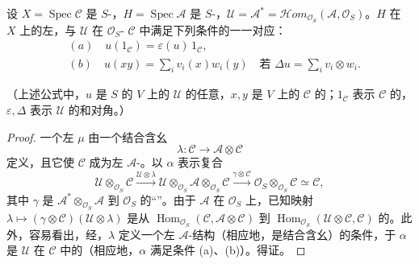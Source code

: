 \begin{SGAresult}{}{}
设 $X=\operatorname{Spec}\mathcal C$ 是 $S$-，$H=\operatorname{Spec}\mathcal A$ 是 $S$-，$\mathcal U=\mathcal A^*=\mathcal Hom_{\mathcal O_S}(\mathcal A,\mathcal O_S)$。$H$ 在 $X$ 上的左，与 $\mathcal U$ 在 $\mathcal O_S$- $\mathcal C$ 中满足下列条件的一一对应：
\[
\begin{aligned}
 {}&(a)\quad u(1_{\mathcal C})=\varepsilon(u)\,1_{\mathcal C},\\
 &(b)\quad u(xy)=\sum_i v_i(x)w_i(y)
 \quad\text{若 }\Delta u=\sum_i v_i\otimes w_i.
\end{aligned}
\]
\end{SGAresult}
（上述公式中，$u$ 是 $S$ 的 $V$ 上的 $\mathcal U$ 的任意，$x,y$ 是 $V$ 上的 $\mathcal C$ 的；$1_{\mathcal C}$ 表示 $\mathcal C$ 的，$\varepsilon,\Delta$ 表示 $\mathcal U$ 的和对角。）
\begin{proof}
一个左 $\mu$ 由一个结合含幺
\[
 \lambda:\mathcal C\longrightarrow\mathcal A\otimes\mathcal C
\]
定义，且它使 $\mathcal C$ 成为左 $\mathcal A$-。以 $\alpha$ 表示复合
\[
 \mathcal U\otimes_{\mathcal O_S}\mathcal C\xrightarrow{\mathcal U\otimes\lambda}
 \mathcal U\otimes_{\mathcal O_S}\mathcal A\otimes_{\mathcal O_S}\mathcal C
 \xrightarrow{\gamma\otimes\mathcal C}\mathcal O_S\otimes_{\mathcal O_S}\mathcal C\simeq\mathcal C,
\]
其中 $\gamma$ 是 $\mathcal A^*\otimes_{\mathcal O_S}\mathcal A$ 到 $\mathcal O_S$ 的“”。由于 $\mathcal A$ 在 $\mathcal O_S$ 上，已知映射 $\lambda\mapsto(\gamma\otimes\mathcal C)(\mathcal U\otimes\lambda)$ 是从
$\operatorname{Hom}_{\mathcal O_S}(\mathcal C,\mathcal A\otimes\mathcal C)$ 到
$\operatorname{Hom}_{\mathcal O_S}(\mathcal U\otimes\mathcal C,\mathcal C)$ 的。此外，容易看出，经，$\lambda$ 定义一个左 $\mathcal A$-结构（相应地，是结合含幺）的条件，于 $\alpha$ 是 $\mathcal U$ 在 $\mathcal C$ 中的（相应地，$\alpha$ 满足条件 (a)、(b)）。得证。
\end{proof}

